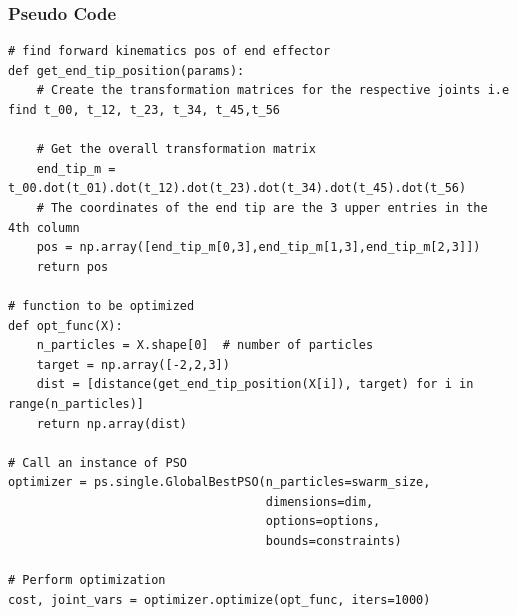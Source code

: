 \subsubsection{Pseudo Code}
\begin{verbatim}
# find forward kinematics pos of end effector
def get_end_tip_position(params):
    # Create the transformation matrices for the respective joints i.e find t_00, t_12, t_23, t_34, t_45,t_56

    # Get the overall transformation matrix
    end_tip_m = t_00.dot(t_01).dot(t_12).dot(t_23).dot(t_34).dot(t_45).dot(t_56)
    # The coordinates of the end tip are the 3 upper entries in the 4th column
    pos = np.array([end_tip_m[0,3],end_tip_m[1,3],end_tip_m[2,3]])
    return pos

# function to be optimized
def opt_func(X):
    n_particles = X.shape[0]  # number of particles
    target = np.array([-2,2,3])
    dist = [distance(get_end_tip_position(X[i]), target) for i in range(n_particles)]
    return np.array(dist)

# Call an instance of PSO
optimizer = ps.single.GlobalBestPSO(n_particles=swarm_size,
                                    dimensions=dim,
                                    options=options,
                                    bounds=constraints)

# Perform optimization
cost, joint_vars = optimizer.optimize(opt_func, iters=1000)
\end{verbatim}


